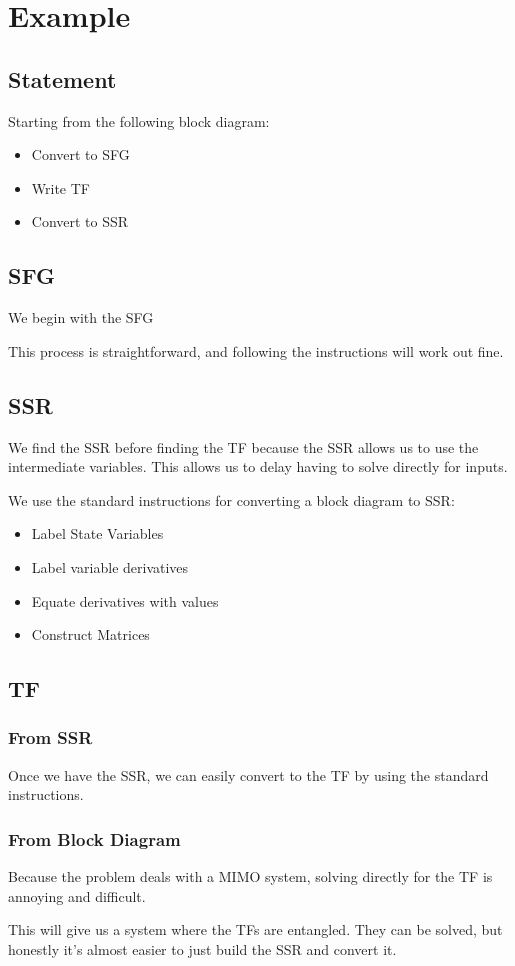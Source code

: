 \documentclass{../templates/topic}
\begin{document}
\section{Example}

\subsection{Statement}
Starting from the following block diagram:
\begin{itemize}
	\item Convert to SFG
	\item Write TF
	\item Convert to SSR
\end{itemize}

\subsection{SFG}
We begin with the SFG

This process is straightforward, and following the instructions will work out fine.


\subsection{SSR}
We find the SSR before finding the TF because the SSR allows us to use the intermediate variables. This allows us to delay having to solve directly for inputs.

We use the standard instructions for converting a block diagram to SSR:

\begin{itemize}
	\item Label State Variables
	
	\item Label variable derivatives
	
	\item Equate derivatives with values
	
	\item Construct Matrices
\end{itemize}

\subsection{TF}
\subsubsection{From SSR}
Once we have the SSR, we can easily convert to the TF by using the standard instructions.

\subsubsection{From Block Diagram}
Because the problem deals with a MIMO system, solving directly for the TF is annoying and difficult.

This will give us a system where the TFs are entangled. They can be solved, but honestly it's almost easier to just build the SSR and convert it.
\end{document}

